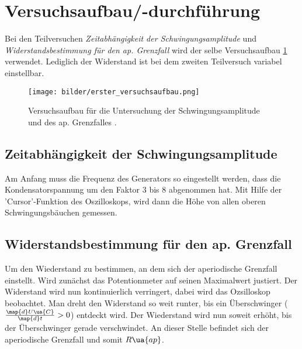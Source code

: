 \section{Versuchsaufbau/-durchführung}
Bei den Teilversuchen \emph{Zeitabhängigkeit der Schwingungsamplitude}
und \emph{Widerstandsbestimmung für den ap. Grenzfall} wird der selbe
Versuchsaufbau \ref{fig:aufbau_eins} verwendet. Lediglich der Widerstand ist bei dem
zweiten Teilversuch variabel einstellbar.
\begin{figure}
  \centering
  \texttt{[image: bilder/erster\_versuchsaufbau.png]}
  \caption{Versuchsaufbau für die Untersuchung der Schwingungsamplitude und des ap. Grenzfalles \cite{anleitung354}. }
  \label{fig:aufbau_eins}
\end{figure}
\subsection{Zeitabhängigkeit der Schwingungsamplitude}
Am Anfang muss die Frequenz des Generators %
so eingestellt werden, dass die Kondensatorspannung um den Faktor $3$ bis $8$
abgenommen hat. Mit Hilfe der 'Cursor'-Funktion des Oszilloskops, wird dann %
die Höhe von allen oberen Schwingungsbäuchen gemessen.
\subsection{Widerstandsbestimmung für den ap. Grenzfall}
Um den Wiederstand zu bestimmen, an dem sich der aperiodische Grenzfall
einstellt. Wird zunächst das Potentionmeter auf seinen Maximalwert justiert.
Der Widerstand wird nun kontinuierlich verringert, dabei wird das %
Ozsilloskop beobachtet. Man dreht den Widerstand so weit runter, bis %
ein Überschwinger ($\frac{\map{d}U\ua{C}}{\map{d}t}>0$) entdeckt wird.
Der Wiederstand wird nun soweit erhöht, bis der Überschwinger gerade verschwindet.
An dieser Stelle befindet sich der aperiodische Grenzfall und somit $R\ua{ap}$. %
